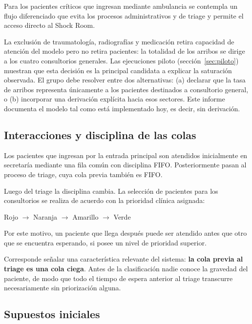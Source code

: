 Para los pacientes críticos que ingresan mediante ambulancia se contempla un
flujo diferenciado que evita los procesos administrativos y de triage y
permite el acceso directo al Shock Room.

\begin{pendiente}
La exclusión de traumatología, radiografías y medicación retira capacidad de
atención del modelo pero no retira pacientes: la totalidad de los arribos se
dirige a los cuatro consultorios generales. Las ejecuciones piloto
(sección~\ref{sec:piloto}) muestran que esta decisión es la principal
candidata a explicar la saturación observada. El grupo debe resolver entre
dos alternativas: (a) declarar que la tasa de arribos representa únicamente
a los pacientes destinados a consultorio general, o (b) incorporar una
derivación explícita hacia esos sectores. Este informe documenta el modelo
tal como está implementado hoy, es decir, sin derivación.
\end{pendiente}

\subsection{Interacciones y disciplina de las colas}

Los pacientes que ingresan por la entrada principal son atendidos inicialmente
en secretaría mediante una fila común con disciplina FIFO. Posteriormente
pasan al proceso de triage, cuya cola previa también es FIFO.

Luego del triage la disciplina cambia. La selección de pacientes para los
consultorios se realiza de acuerdo con la prioridad clínica asignada:

\begin{center}
Rojo $\rightarrow$ Naranja $\rightarrow$ Amarillo $\rightarrow$ Verde
\end{center}

Por este motivo, un paciente que llega después puede ser atendido antes que
otro que se encuentra esperando, si posee un nivel de prioridad superior.

Corresponde señalar una característica relevante del sistema: \textbf{la cola
previa al triage es una cola ciega}. Antes de la clasificación nadie conoce la
gravedad del paciente, de modo que todo el tiempo de espera anterior al
triage transcurre necesariamente sin priorización alguna.

\subsection{Supuestos iniciales}

